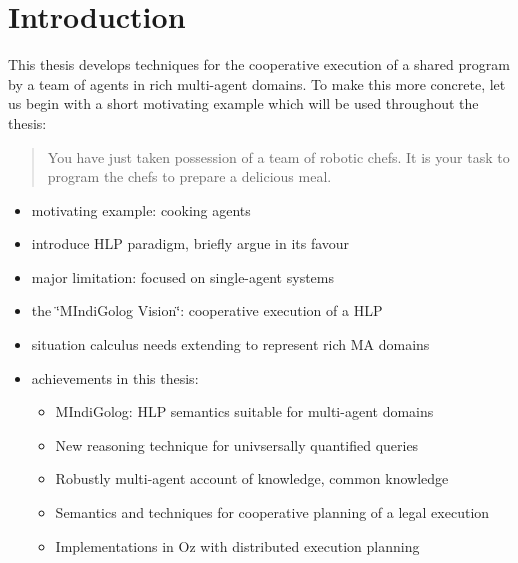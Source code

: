  


\chapter{Introduction}

This thesis develops techniques for the cooperative execution of a
shared program by a team of agents in rich multi-agent domains. To
make this more concrete, let us begin with a short motivating example
which will be used throughout the thesis:

\begin{quote}
You have just taken possession of a team of robotic chefs. It is your
task to program the chefs to prepare a delicious meal. 
\end{quote}
\begin{itemize}
\item motivating example: cooking agents 
\item introduce HLP paradigm, briefly argue in its favour 
\item major limitation: focused on single-agent systems 
\item the \char`\"{}MIndiGolog Vision\char`\"{}: cooperative execution of
a HLP 
\item situation calculus needs extending to represent rich MA domains
\item achievements in this thesis:

\begin{itemize}
\item MIndiGolog: HLP semantics suitable for multi-agent domains 
\item New reasoning technique for univsersally quantified queries 
\item Robustly multi-agent account of knowledge, common knowledge 
\item Semantics and techniques for cooperative planning of a legal execution 
\item Implementations in Oz with distributed execution planning 
\end{itemize}
\end{itemize}
